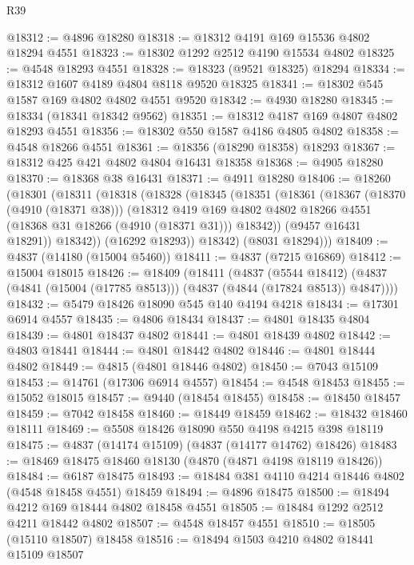 \begin{lexlean}{R39}
\begin{coremodule}
@18312 := @4896 @18280
@18318 := @18312 @4191 @169 @15536 @4802 @18294 @4551
@18323 := @18302 @1292 @2512 @4190 @15534 @4802
@18325 := @4548 @18293 @4551
@18328 := @18323 (@9521 @18325) @18294
@18334 := @18312 @1607 @4189 @4804 @8118 @9520 @18325
@18341 := @18302 @545 @1587 @169 @4802 @4802 @4551 @9520
@18342 := @4930 @18280
@18345 := @18334 (@18341 @18342 @9562)
@18351 := @18312 @4187 @169 @4807 @4802 @18293 @4551
@18356 := @18302 @550 @1587 @4186 @4805 @4802
@18358 := @4548 @18266 @4551
@18361 := @18356 (@18290 @18358) @18293
@18367 := @18312 @425 @421 @4802 @4804 @16431 @18358
@18368 := @4905 @18280
@18370 := @18368 @38 @16431
@18371 := @4911 @18280
@18406 := @18260
    (@18301
      (@18311
        (@18318
          (@18328
            (@18345
              (@18351
                (@18361
                  (@18367
                    (@18370 (@4910 (@18371 @38)))
                    (@18312
                      @419
                      @169
                      @4802
                      @4802
                      @18266
                      @4551
                      (@18368 @31 @18266 (@4910 (@18371 @31)))
                      @18342))
                  (@9457 @16431 @18291))
                @18342))
            (@16292 @18293))
          @18342)
        (@8031 @18294)))
@18409 := @4837 (@14180 (@15004 @5460))
@18411 := @4837 (@7215 @16869)
@18412 := @15004 @18015
@18426 := @18409
    (@18411
      (@4837
        (@5544 @18412)
        (@4837 (@4841 (@15004 (@17785 @8513))) (@4837 (@4844 (@17824 @8513)) @4847))))
@18432 := @5479 @18426 @18090 @545 @140 @4194 @4218
@18434 := @17301 @6914 @4557
@18435 := @4806 @18434
@18437 := @4801 @18435 @4804
@18439 := @4801 @18437 @4802
@18441 := @4801 @18439 @4802
@18442 := @4803 @18441
@18444 := @4801 @18442 @4802
@18446 := @4801 @18444 @4802
@18449 := @4815 (@4801 @18446 @4802)
@18450 := @7043 @15109
@18453 := @14761 (@17306 @6914 @4557)
@18454 := @4548 @18453
@18455 := @15052 @18015
@18457 := @9440 (@18454 @18455)
@18458 := @18450 @18457
@18459 := @7042 @18458
@18460 := @18449 @18459
@18462 := @18432 @18460 @18111
@18469 := @5508 @18426 @18090 @550 @4198 @4215 @398 @18119
@18475 := @4837 (@14174 @15109) (@4837 (@14177 @14762) @18426)
@18483 := @18469 @18475 @18460 @18130 (@4870 (@4871 @4198 @18119 @18426))
@18484 := @6187 @18475
@18493 := @18484 @381 @4110 @4214 @18446 @4802 (@4548 @18458 @4551) @18459
@18494 := @4896 @18475
@18500 := @18494 @4212 @169 @18444 @4802 @18458 @4551
@18505 := @18484 @1292 @2512 @4211 @18442 @4802
@18507 := @4548 @18457 @4551
@18510 := @18505 (@15110 @18507) @18458
@18516 := @18494 @1503 @4210 @4802 @18441 @15109 @18507

\end{coremodule}
\end{lexlean}
